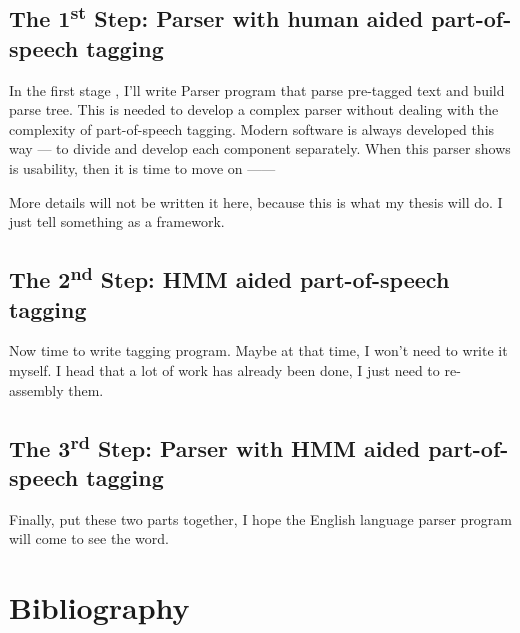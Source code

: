 \subsection{The 1\textsuperscript{st} Step: Parser with human aided part-of-speech tagging}

In the first stage , I'll write Parser program that parse pre-tagged text and build parse tree.
This is needed to develop a complex parser without dealing with the complexity of part-of-speech tagging. Modern software is always developed this way --- to divide  and develop each
component separately. When this parser shows is usability, then it is time to move on ------ 

More details will not be written it here, because this is what my thesis will do. I just tell something as a framework.

\subsection{The 2\textsuperscript{nd} Step: HMM aided part-of-speech tagging}

Now time to write tagging program. Maybe at that time, I won't need to write it myself.
I head that a lot of work has already been done, I just need to re-assembly them.

\subsection{The 3\textsuperscript{rd} Step: Parser with HMM aided part-of-speech tagging}

Finally, put these two parts together, I hope the English language parser program will come to see the word.

\section{Bibliography}
\nocite{GPL}


